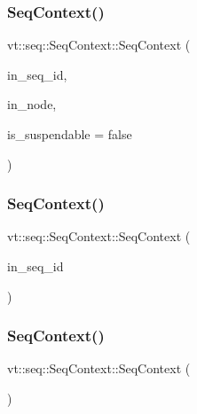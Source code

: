 \subsubsection{\texorpdfstring{Seq\+Context()}{SeqContext()}\hspace{0.1cm}{\footnotesize\ttfamily [1/3]}}
{\footnotesize\ttfamily vt\+::seq\+::\+Seq\+Context\+::\+Seq\+Context (\begin{DoxyParamCaption}\item[{\hyperlink{namespacevt_1_1seq_a3b612da217ac669d39c159f134ab8434}{Seq\+Type} const \&}]{in\+\_\+seq\+\_\+id,  }\item[{\hyperlink{namespacevt_1_1seq_ae6a4874b585be0612aaca32ca6d2d191}{Seq\+Node\+Ptr\+Type}}]{in\+\_\+node,  }\item[{bool}]{is\+\_\+suspendable = {\ttfamily false} }\end{DoxyParamCaption})}

\mbox{\label{structvt_1_1seq_1_1_seq_context_a797189d52bbfd7eb2f776119068461bd}} 
\subsubsection{\texorpdfstring{Seq\+Context()}{SeqContext()}\hspace{0.1cm}{\footnotesize\ttfamily [2/3]}}
{\footnotesize\ttfamily vt\+::seq\+::\+Seq\+Context\+::\+Seq\+Context (\begin{DoxyParamCaption}\item[{\hyperlink{namespacevt_1_1seq_a3b612da217ac669d39c159f134ab8434}{Seq\+Type} const \&}]{in\+\_\+seq\+\_\+id }\end{DoxyParamCaption})}

\mbox{\label{structvt_1_1seq_1_1_seq_context_a296fda6917a2f69772f8f1b9faceeadb}} 
\subsubsection{\texorpdfstring{Seq\+Context()}{SeqContext()}\hspace{0.1cm}{\footnotesize\ttfamily [3/3]}}
{\footnotesize\ttfamily vt\+::seq\+::\+Seq\+Context\+::\+Seq\+Context (\begin{DoxyParamCaption}\item[{\hyperlink{structvt_1_1seq_1_1_seq_context}{Seq\+Context} const \&}]{ }\end{DoxyParamCaption})\hspace{0.3cm}{\ttfamily [delete]}}



